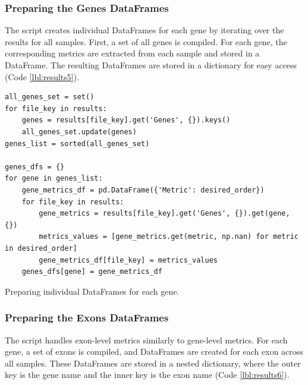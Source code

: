 \subsubsection{\textbf{Preparing the Genes DataFrames}}

The script creates individual DataFrames for each gene by iterating over the results for all samples. First, a set of all genes is compiled. For each gene, the corresponding metrics are extracted from each sample and stored in a DataFrame. The resulting DataFrames are stored in a dictionary for easy access (Code \ref{lbl:results5}).

\begin{longlisting}
\begin{verbatim}
all_genes_set = set()
for file_key in results:
    genes = results[file_key].get('Genes', {}).keys()
    all_genes_set.update(genes)
genes_list = sorted(all_genes_set)

genes_dfs = {}
for gene in genes_list:
    gene_metrics_df = pd.DataFrame({'Metric': desired_order})
    for file_key in results:
        gene_metrics = results[file_key].get('Genes', {}).get(gene, {})
        metrics_values = [gene_metrics.get(metric, np.nan) for metric in desired_order]
        gene_metrics_df[file_key] = metrics_values
    genes_dfs[gene] = gene_metrics_df
\end{verbatim}
\caption{Preparing individual DataFrames for each gene.}
\label{lbl:results5}
\end{longlisting}

\subsubsection{\textbf{Preparing the Exons DataFrames}}

The script handles exon-level metrics similarly to gene-level metrics. For each gene, a set of exons is compiled, and DataFrames are created for each exon across all samples. These DataFrames are stored in a nested dictionary, where the outer key is the gene name and the inner key is the exon name (Code \ref{lbl:results6}).

